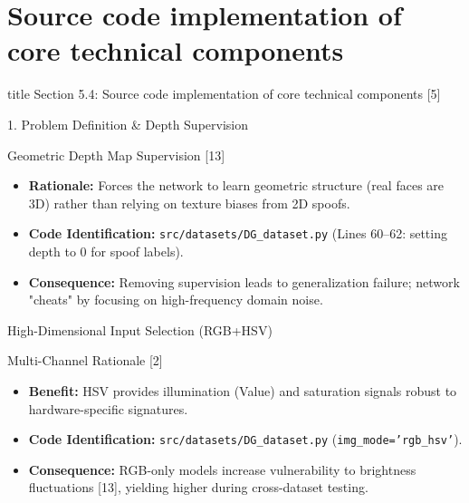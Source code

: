 \section{Source code implementation of core technical components}

\begin{frame}
    \vfill
    \centering
    \begin{beamercolorbox}[sep=8pt,center,shadow=true,rounded=true]{title}
        Section 5.4: Source code implementation of core technical components [5]\par%
    \end{beamercolorbox}
    \vfill
\end{frame}

\begin{frame}{1. Problem Definition \& Depth Supervision}
    \begin{block}{Geometric Depth Map Supervision [13]}
        \begin{itemize}
            \item \textbf{Rationale:} Forces the network to learn geometric structure (real faces are 3D) rather than relying on texture biases from 2D spoofs.
            \item \textbf{Code Identification:} \texttt{src/datasets/DG\_dataset.py} (Lines 60--62: setting depth to 0 for spoof labels).
            \item \textbf{Consequence:} Removing supervision leads to generalization failure; network "cheats" by focusing on high-frequency domain noise.
        \end{itemize}
    \end{block}
\end{frame}

\begin{frame}{High-Dimensional Input Selection (RGB+HSV)}
    \begin{block}{Multi-Channel Rationale [2]}
        \begin{itemize}
            \item \textbf{Benefit:} HSV provides illumination (Value) and saturation signals robust to hardware-specific signatures.
            \item \textbf{Code Identification:} \texttt{src/datasets/DG\_dataset.py} (\texttt{img\_mode='rgb\_hsv'}).
            \item \textbf{Consequence:} RGB-only models increase vulnerability to brightness fluctuations [13], yielding higher  during cross-dataset testing.
        \end{itemize}
    \end{block}
\end{frame}

